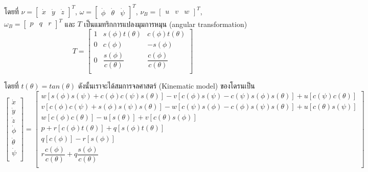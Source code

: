 \documentclass{classes/fiboReport}
\begin{document}
โดยที่ $\nu = [\begin{matrix}\dot{x} & \dot{y} & \dot{z} \end{matrix}]^T$, $\omega = [\begin{matrix}\dot\phi & \dot\theta & \dot\psi \end{matrix}]^T$,
$\nu_{B} = [\begin{matrix}u & v & w \end{matrix}]^T$, $\omega_{B} = [\begin{matrix}p & q & r \end{matrix}]^T$ และ $T$
เป็นแมทริกการแปลงมุมการหมุน (angular transformation)
\begin{equation}
	{T = \begin{bmatrix}
		1 & s(\phi)t(\theta) & c(\phi)t(\theta) \\
		0 & c(\phi) & -s(\phi) \\
		0 & \dfrac{s(\phi)}{c(\theta)}  & \dfrac{c(\phi)}{c(\theta)} \\
		\end{bmatrix}}
	\label{equ:angular_transformation}
\end{equation}

โดยที่ $t(\theta) = tan(\theta)$ ดังนั้นเราจะได้สมการจลศาสตร์ (Kinematic model) ของโดรนเป็น
\begin{equation}
	{\begin{bmatrix}
		\dot{x}  \\
		\dot{y}  \\
		\dot{z} \\
		\dot{\phi} \\
		\dot{\theta} \\
		\dot{\psi} \\
		\end{bmatrix} = 
		\begin{bmatrix}
			w[s(\phi)s(\psi)+c(\phi)c(\psi)s(\theta)]-v[c(\phi)s(\psi)-c(\psi)s(\phi)s(\theta)]+u[c(\psi)c(\theta)] \\
			v[c(\phi)c(\psi)+s(\phi)s(\psi)s(\theta)]-w[c(\psi)s(\phi)-c(\phi)s(\psi)s(\theta)]+u[c(\theta)s(\psi)] \\
			w[c(\phi)c(\theta)]-u[s(\theta)]+v[c(\theta)s(\phi)]                                                    \\
			p+r[c(\phi)t(\theta)]+q[s(\phi)t(\theta)]                                                               \\
			q[c(\phi)]-r[s(\phi)]                                                                                   \\
			r\dfrac{c(\phi)}{c(\theta)}+q\dfrac{s(\phi)}{c(\theta)}                                                 \\
		\end{bmatrix}	}
	\label{equ:kinematic model}
\end{equation}
\end{document}
